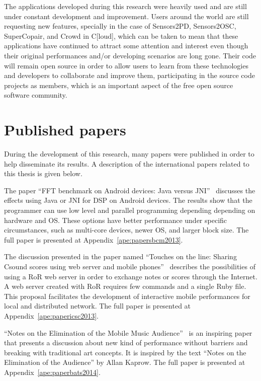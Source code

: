 The applications developed during this research were heavily used and are still under constant development and improvement.
Users around the world are still requesting new features, specially in the case of Sensors2PD, Sensors2OSC, SuperCopair, and Crowd in C[loud], which can be taken to mean that these applications have continued to attract some attention and interest even though their original performances and/or developing scenarios are long gone.
Their code will remain open source in order to allow users to learn from these technologies and developers to collaborate and improve them, participating in the source code projects as members, which is an important aspect of the free open source software community.

\section{Published papers}

During the development of this research, many papers were published in order to help disseminate its results.
A description of the international papers related to this thesis is given below.

The paper ``FFT benchmark on Android devices: Java versus JNI''~\citep{deCarvalhoJunior2013fftbenchmark} discusses the effects using Java or JNI for DSP on Android devices.
The results show that the programmer can use low level and parallel programming depending depending on hardware and OS.
These options have better performance under specific circumstances, such as multi-core devices, newer OS, and larger block size.
The full paper is presented at Appendix~\ref{ape:papersbcm2013}.

The discussion presented in the paper named ``Touches on the line: Sharing Csound scores using web server and mobile phones''~\citep{deCarvalhoJunior2013touches} describes the possibilities of using a RoR web server in order to exchange notes or scores through the Internet.
A web server created with RoR requires few commands and a single Ruby file.
This proposal facilitates the development of interactive mobile performances for local and distributed network.
The full paper is presented at Appendix~\ref{ape:papericsc2013}.

``Notes on the Elimination of the Mobile Music Audience''~\citep{Bandeira2014notes} is an inspiring paper that presents a discussion about new kind of performance without barriers and breaking with traditional art concepts.
It is inspired by the text ``Notes on the Elimination of the Audience'' by Allan Kaprow.
The full paper is presented at Appendix~\ref{ape:paperbats2014}.

